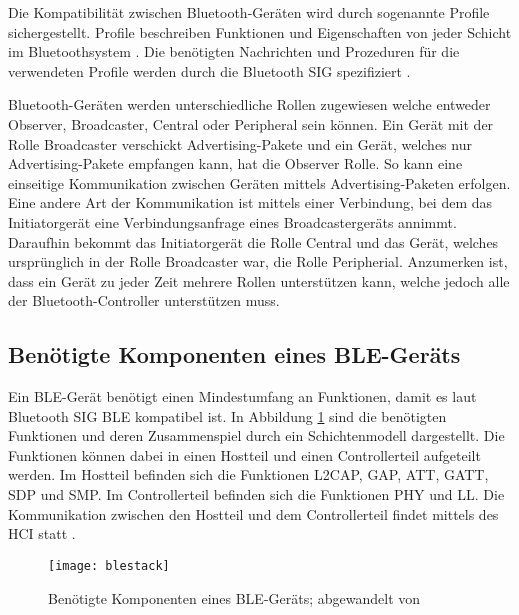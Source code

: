 Die Kompatibilität zwischen Bluetooth-Geräten wird durch sogenannte Profile sichergestellt. Profile beschreiben Funktionen und Eigenschaften von jeder Schicht im Bluetoothsystem \cite[S.~277]{bluetoothCore}. Die benötigten Nachrichten und Prozeduren für die verwendeten Profile werden durch die Bluetooth \ac{SIG} spezifiziert \cite[S.~1241]{bluetoothCore}.

Bluetooth-Geräten werden unterschiedliche Rollen zugewiesen welche entweder Observer, Broadcaster, Central oder Peripheral sein können. Ein Gerät mit der Rolle Broadcaster verschickt Advertising-Pakete und ein Gerät, welches nur Advertising-Pakete empfangen kann, hat die Observer Rolle. So kann eine einseitige Kommunikation zwischen Geräten mittels Advertising-Paketen erfolgen. Eine andere Art der Kommunikation ist mittels einer Verbindung, bei dem das Initiatorgerät eine Verbindungsanfrage eines Broadcastergeräts annimmt. Daraufhin bekommt das Initiatorgerät die Rolle Central und das Gerät, welches ursprünglich in der Rolle Broadcaster war, die Rolle Peripherial. Anzumerken ist, dass ein Gerät zu jeder Zeit mehrere Rollen unterstützen kann, welche jedoch alle der Bluetooth-Controller unterstützen muss. \cite[S.~190f., S.~278, S.~1246ff.]{bluetoothCore}

\subsection{Benötigte Komponenten eines \ac{BLE}-Geräts}

Ein \ac{BLE}-Gerät benötigt einen Mindestumfang an Funktionen, damit es laut Bluetooth \ac{SIG} \ac{BLE} kompatibel ist. In Abbildung \ref{fig:blestack} sind die benötigten Funktionen und deren Zusammenspiel durch ein Schichtenmodell dargestellt. Die Funktionen können dabei in einen Hostteil und einen Controllerteil aufgeteilt werden. Im Hostteil befinden sich die Funktionen \ac{L2CAP}, \ac{GAP}, \ac{ATT}, \ac{GATT}, \ac{SDP} und \ac{SMP}. Im Controllerteil befinden sich die Funktionen \ac{PHY} und \ac{LL}. Die Kommunikation zwischen den Hostteil und dem Controllerteil findet mittels des \ac{HCI} statt \cite[S.~1735]{bluetoothCore}. \cite[S.~193]{bluetoothCore}

\begin{figure}[H]
    \centering
    \texttt{[image: blestack]}
    \caption{Benötigte Komponenten eines \acs{BLE}-Geräts; abgewandelt von \cite[S.~203, S.~1245]{bluetoothCore}}
    \label{fig:blestack}
\end{figure}

